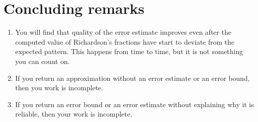 \documentclass[a4paper,12pt]{article}
\newcounter{remark}
\begin{document}
 \section{Concluding remarks}
 \begin{enumerate}
 \item You will find that quality of the error estimate improves even after the computed value of Richardson's fractions have start to deviate from the expected pattern. This happens from time to time, but it is not something you can count on.
 \item If you return an approximation without an error estimate or an error bound, then you work is incomplete.
   \item If you return an error bound or an error estimate without explaining why it is reliable, then your work is incomplete.
 \end{enumerate}
  

 

  
  
\end{document}
